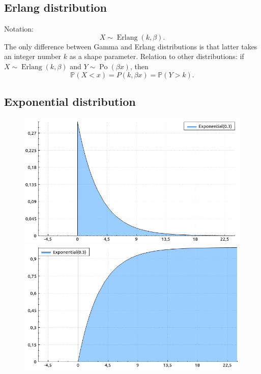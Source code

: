 \documentclass[a4paper,11pt]{article}
\theoremstyle{plain}
\theoremstyle{definition}
\newcommand{\MP}{\mathbb{P}}
\begin{document}
	\subsection{Erlang distribution}
	Notation:
	\[
	X \sim \operatorname{Erlang}(k, \beta).
	\]
	The only difference between Gamma and Erlang distributions is that latter takes an integer number $k$ as a shape parameter.
	Relation to other distributions: if $X \sim \operatorname{Erlang}(k, \beta)$ and $Y \sim \operatorname{Po}(\beta x)$, then 
	\[\MP(X < x) = P(k, \beta x) = \MP(Y > k).\]
	
	\subsection{Exponential distribution}
	\begin{figure}[!htb]\centering
		\begin{minipage}{0.55\textwidth}
			\includegraphics[width=\linewidth, right]{exponential_pdf}
			\captionsetup{labelformat=empty}
			\includegraphics[width=\linewidth, right]{exponential_cdf}
			\captionsetup{labelformat=empty}

\end{minipage}
\end{figure}
\end{document}
